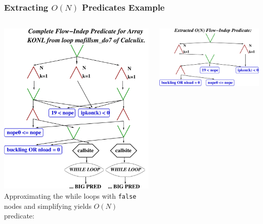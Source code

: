 \documentclass{beamer}
\newcommand{\emp}[1]{\textcolor{DikuRed}{ #1}}
\begin{document}
\begin{frame}[fragile,t]
  \frametitle{Extracting $O(N)$ Predicates Example}

\bigskip

\begin{columns} 
\includegraphics[height=39ex]{Figures/CALCULIX_PDAG1}
Approximating the while loops with {\tt false} nodes and simplifying yields $O(N)$ predicate: 

\bigskip

\includegraphics[height=20ex]{Figures/CALCULIX_PDAG2}
\end{columns}


\end{frame}

%
%
%
%
%
\end{document}
